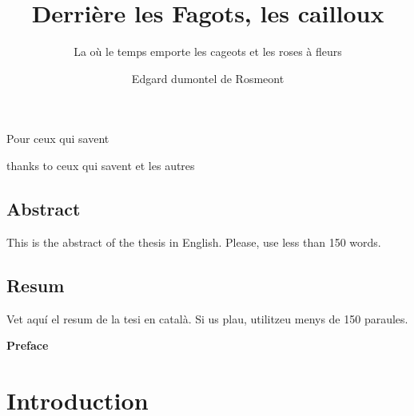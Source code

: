 \documentclass[12pt, b5paper,twoside]{tesi_upf}
\title{Derrière les Fagots, les cailloux}
\subtitle{La où le temps emporte les cageots et les roses à fleurs}
\author{Edgard dumontel de Rosmeont}
\begin{document}
\frontmatter

\maketitle

\cleardoublepage



\noindent Pour ceux qui savent

\cleardoublepage



 thanks to ceux qui savent et les autres

\cleardoublepage


\section*{\Large \sffamily Abstract}
This is the abstract of the thesis in English.  Please, use less
than 150 words.

\vspace*{\fill}
\section*{\Large \sffamily  Resum}
Vet aquí el resum de la tesi en català.  Si us plau, utilitzeu
menys de 150 paraules.
\vspace*{\fill}

\cleardoublepage

{\bf Preface}

\cleardoublepage


\tableofcontents

\listoffigures

\listoftables

\mainmatter
\chapter*{Introduction}
\end{document}
